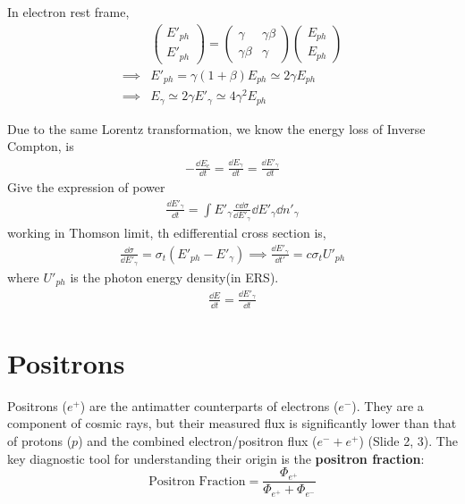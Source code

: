 \documentclass{sciposter}
\begin{document}
\begin{multicols}{3}
In electron rest frame,
\begin{align}
    &\begin{pmatrix}
    E'_{ph} \\
    E'_{ph} 
    \end{pmatrix}=\begin{pmatrix}
    \gamma &\gamma \beta \\
    \gamma \beta &\gamma 
    \end{pmatrix}\begin{pmatrix}
    E_{ph} \\
    E_{ph} 
    \end{pmatrix}\\
    \implies &E'_{ph}=\gamma(1+\beta)E_{ph}\simeq 2\gamma E_{ph}   \\
    \implies&E_{\gamma} \simeq 2 \gamma E'_{\gamma}\simeq 4 \gamma ^{2}E_{ph}    
\end{align}

Due to the same Lorentz transformation, we know the energy loss of Inverse Compton, is 
\begin{align}
    -\frac{\dd{E_{e} }}{\dd{t}}=\frac{\dd{E_{\gamma} }}{\dd{t}}=\frac{\dd{E'_{\gamma} }}{\dd{t}}
\end{align}
Give the expression of power 
\begin{align}
    \frac{\dd{E'_{\gamma} }}{\dd{t}}=\int E'_{\gamma}\frac{c\dd{\sigma}}{\dd{E'_{\gamma} }}\dd{E'_{\gamma} }\dd{n'_{\gamma} }
\end{align}
working in Thomson limit, th edifferential cross section is,
\begin{align}
    \frac{\dd{\sigma}}{\dd{E'_{\gamma} }}=\sigma_{t}(E'_{ph}-E'_{\gamma}  )\implies \frac{\dd{E'_{\gamma} }}{\dd{t'}}=c\sigma_{t}U'_{ph}   
\end{align}
where $U'_{ph} $ is the photon energy density(in ERS).
\begin{align}
    \frac{\dd{E}}{\dd{t}}=\frac{\dd{E'_{\gamma} }}{\dd{t}}
\end{align}

\section{ Positrons}
Positrons ($e^+$) are the antimatter counterparts of electrons ($e^-$). They are a component of cosmic rays, but their measured flux is significantly lower than that of protons ($p$) and the combined electron/positron flux ($e^- + e^+$) (Slide 2, 3). The key diagnostic tool for understanding their origin is the \textbf{positron fraction}:
$$
\text{Positron Fraction} = \frac{\Phi_{e^+}}{\Phi_{e^+} + \Phi_{e^-}}
$$


\end{multicols}
\end{document}
